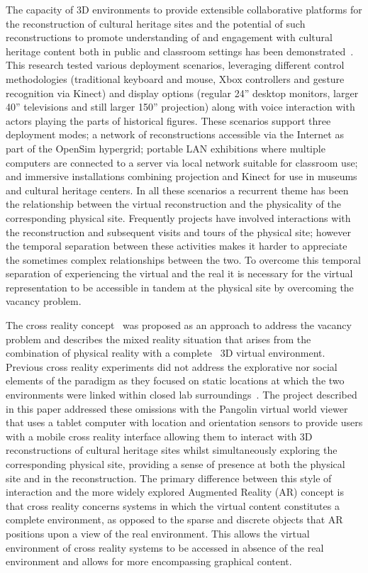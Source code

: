 The capacity of 3D environments to provide extensible collaborative platforms for the reconstruction of cultural heritage sites and the potential of such reconstructions to promote understanding of and engagement with cultural heritage content both in public and classroom settings has been demonstrated~\cite{Allison2012,Kennedy2012}. This research tested various deployment scenarios, leveraging different control methodologies (traditional keyboard and mouse, Xbox controllers and gesture recognition via Kinect) and display options (regular 24'' desktop monitors, larger 40'' televisions and still larger 150'' projection) along with voice interaction with actors playing the parts of historical figures. These scenarios support three deployment modes; a network of reconstructions accessible via the Internet as part of the OpenSim hypergrid; portable LAN exhibitions where multiple computers are connected to a server via local network suitable for classroom use; and immersive installations combining projection and Kinect for use in museums and cultural heritage centers. In all these scenarios a recurrent theme has been the relationship between the virtual reconstruction and the physicality of the corresponding physical site. Frequently projects have involved interactions with the reconstruction and subsequent visits and tours of the physical site; however the temporal separation between these activities makes it harder to appreciate the sometimes complex relationships between the two. To overcome this temporal separation of experiencing the virtual and the real it is necessary for the virtual representation to be accessible in tandem at the physical site by overcoming the vacancy problem.

The cross reality concept~\cite{Lifton2007a, Paradiso2009} was proposed as an approach to address the vacancy problem and describes the mixed reality situation that arises from the combination of physical reality with a complete~\cite{lifton:merging} 3D virtual environment. Previous cross reality experiments did not address the explorative nor social elements of the paradigm as they focused on static locations at which the two environments were linked within closed lab surroundings~\cite{Applin2011}. The project described in this paper addressed these omissions with the Pangolin virtual world viewer~\cite{Daviesa} that uses a tablet computer with location and orientation sensors to provide users with a mobile cross reality interface allowing them to interact with 3D reconstructions of cultural heritage sites whilst simultaneously exploring the corresponding physical site, providing a sense of presence at both the physical site and in the reconstruction. The primary difference between this style of interaction and the more widely explored Augmented Reality (AR) concept is that cross reality concerns systems in which the virtual content constitutes a complete environment, as opposed to the sparse and discrete objects that AR positions upon a view of the real environment. This allows the virtual environment of cross reality systems to be accessed in absence of the real environment and allows for more encompassing graphical content.

